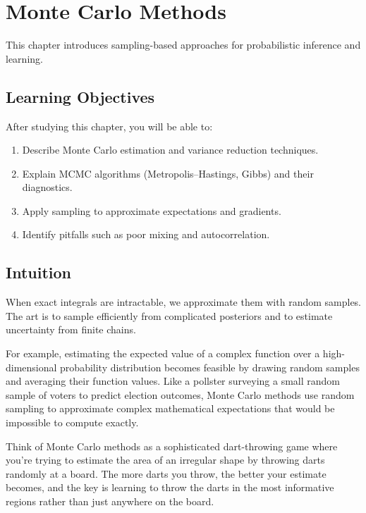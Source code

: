
\chapter{Monte Carlo Methods}
\label{chap:monte-carlo}

This chapter introduces sampling-based approaches for probabilistic inference and learning.


\section*{Learning Objectives}

After studying this chapter, you will be able to:

\begin{enumerate}
    \item Describe Monte Carlo estimation and variance reduction techniques.
    \item Explain MCMC algorithms (Metropolis–Hastings, Gibbs) and their diagnostics.
    \item Apply sampling to approximate expectations and gradients.
    \item Identify pitfalls such as poor mixing and autocorrelation.
\end{enumerate}



\section*{Intuition}

When exact integrals are intractable, we approximate them with random samples. The art is to sample efficiently from complicated posteriors and to estimate uncertainty from finite chains.

For example, estimating the expected value of a complex function over a high-dimensional probability distribution becomes feasible by drawing random samples and averaging their function values. Like a pollster surveying a small random sample of voters to predict election outcomes, Monte Carlo methods use random sampling to approximate complex mathematical expectations that would be impossible to compute exactly.

Think of Monte Carlo methods as a sophisticated dart-throwing game where you're trying to estimate the area of an irregular shape by throwing darts randomly at a board. The more darts you throw, the better your estimate becomes, and the key is learning to throw the darts in the most informative regions rather than just anywhere on the board.











